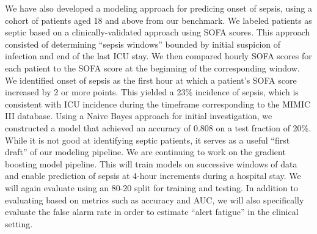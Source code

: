 \documentclass{amia}
\begin{document}
We have also developed a modeling approach for predicing onset of sepsis, using a cohort of patients aged 18 and above
from our benchmark.  We labeled patients as septic based on a clinically-validated approach using SOFA scores.\cite{jones2009}
This approach consisted of determining ``sepsis windows'' bounded by initial suspicion of infection and end of the last
ICU stay.  We then compared hourly SOFA scores for each patient to the SOFA score at the beginning of the corresponding
window.  We identified onset of sepsis as the first hour at which a patient's SOFA score increased by 2 or more
points.  This yielded a 23\% incidence of sepsis, which is consistent with ICU incidence during the
timeframe corresponding to the MIMIC III database.\cite{nee2006}  Using a Naive Bayes approach for initial investigation, 
we constructed a model that achieved an accuracy of 0.808 on a test fraction of 20\%.  While it is not good at 
identifying septic patients, it serves as a useful ``first draft'' of our modeling pipeline.  We are continuing to work on the 
gradient boosting model pipeline.  This will train models on successive windows of data and enable prediction of sepsis at
4-hour increments during a hospital stay.  We will again evaluate using an 80-20 split for training and testing.  In addition
to evaluating based on metrics such as accuracy and AUC, we will also specifically evaluate the false alarm rate in order
to estimate ``alert fatigue'' in the clinical setting.
  
\makeatletter
\renewcommand{\@biblabel}[1]{\hfill #1.}
\makeatother
\end{document}
